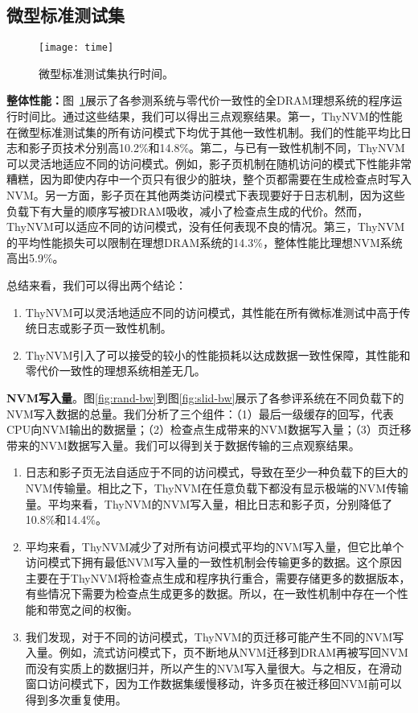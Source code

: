 \subsection{微型标准测试集}

\begin{figure}[!h]
  \centering
  \texttt{[image: time]}
  \caption{微型标准测试集执行时间。}
  \label{fig:micro-time}
\end{figure}

\textbf{整体性能：}图~\ref{fig:micro-time}展示了各参测系统与零代价一致性的全DRAM理想系统的程序运行时间比。通过这些结果，我们可以得出三点观察结果。第一，ThyNVM的性能在微型标准测试集的所有访问模式下均优于其他一致性机制。我们的性能平均比日志和影子页技术分别高10.2\%和14.8\%。第二，与已有一致性机制不同，ThyNVM可以灵活地适应不同的访问模式。例如，影子页机制在随机访问的模式下性能非常糟糕，因为即使内存中一个页只有很少的脏块，整个页都需要在生成检查点时写入NVM。另一方面，影子页在其他两类访问模式下表现要好于日志机制，因为这些负载下有大量的顺序写被DRAM吸收，减小了检查点生成的代价。然而，ThyNVM可以适应不同的访问模式，没有任何表现不良的情况。第三，ThyNVM的平均性能损失可以限制在理想DRAM系统的14.3\%，整体性能比理想NVM系统高出5.9\%。

总结来看，我们可以得出两个结论：
\begin{enumerate}
\item ThyNVM可以灵活地适应不同的访问模式，其性能在所有微标准测试中高于传统日志或影子页一致性机制。 
\item ThyNVM引入了可以接受的较小的性能损耗以达成数据一致性保障，其性能和零代价一致性的理想系统相差无几。
\end{enumerate}

\textbf{NVM写入量}。图\ref{fig:rand-bw}到图\ref{fig:slid-bw}展示了各参评系统在不同负载下的NVM写入数据的总量。我们分析了三个组件：（1）最后一级缓存的回写，代表CPU向NVM输出的数据量；（2）检查点生成带来的NVM数据写入量；（3）页迁移带来的NVM数据写入量。我们可以得到关于数据传输的三点观察结果。
\begin{enumerate}
\item 日志和影子页无法自适应于不同的访问模式，导致在至少一种负载下的巨大的NVM传输量。相比之下，ThyNVM在任意负载下都没有显示极端的NVM传输量。平均来看，ThyNVM的NVM写入量，相比日志和影子页，分别降低了10.8\%和14.4\%。
\item 平均来看，ThyNVM减少了对所有访问模式平均的NVM写入量，但它比单个访问模式下拥有最低NVM写入量的一致性机制会传输更多的数据。这个原因主要在于ThyNVM将检查点生成和程序执行重合，需要存储更多的数据版本，有些情况下需要为检查点生成更多的数据。所以，在一致性机制中存在一个性能和带宽之间的权衡。
\item 我们发现，对于不同的访问模式，ThyNVM的页迁移可能产生不同的NVM写入量。例如，流式访问模式下，页不断地从NVM迁移到DRAM再被写回NVM而没有实质上的数据归并，所以产生的NVM写入量很大。与之相反，在滑动窗口访问模式下，因为工作数据集缓慢移动，许多页在被迁移回NVM前可以得到多次重复使用。 
\end{enumerate}

